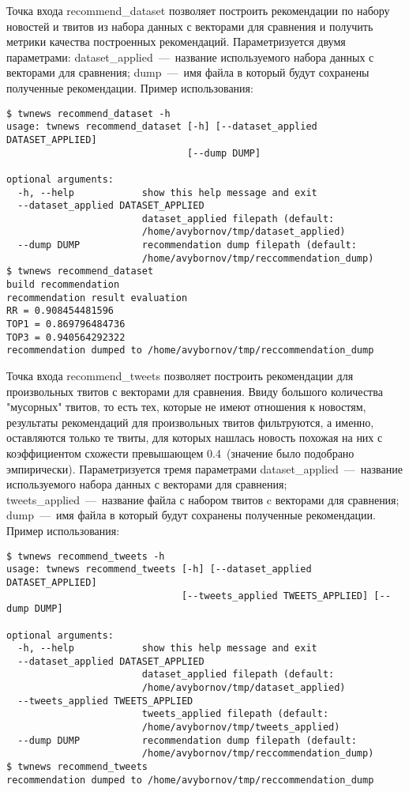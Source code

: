         Точка входа recommend\_dataset позволяет построить рекомендации по набору новостей и твитов из набора данных с векторами для сравнения
        и получить метрики качества построенных рекомендаций.
        Параметризуется двумя параметрами:
        dataset\_applied~---~название используемого набора данных с векторами для сравнения;
        dump~---~имя файла в который будут сохранены полученные рекомендации.
        Пример использования:
        \begin{lstlisting}
$ twnews recommend_dataset -h
usage: twnews recommend_dataset [-h] [--dataset_applied DATASET_APPLIED]
                                [--dump DUMP]

optional arguments:
  -h, --help            show this help message and exit
  --dataset_applied DATASET_APPLIED
                        dataset_applied filepath (default:
                        /home/avybornov/tmp/dataset_applied)
  --dump DUMP           recommendation dump filepath (default:
                        /home/avybornov/tmp/reccommendation_dump)
$ twnews recommend_dataset
build recommendation
recommendation result evaluation
RR = 0.908454481596
TOP1 = 0.869796484736
TOP3 = 0.940564292322
recommendation dumped to /home/avybornov/tmp/reccommendation_dump
        \end{lstlisting}


        Точка входа recommend\_tweets позволяет построить рекомендации для произвольных твитов с векторами для сравнения.
        Ввиду большого количества "мусорных" твитов, то есть тех, которые не имеют отношения к новостям, результаты рекомендаций
        для произвольных твитов фильтруются, а именно, оставляются только те твиты, для которых нашлась новость похожая на них
        с коэффициентом схожести превышающем 0.4~(значение было подобрано эмпирически).
        Параметризуется тремя параметрами
        dataset\_applied~---~название используемого набора данных с векторами для сравнения;
        tweets\_applied~---~название файла с набором твитов c векторами для сравнения;
        dump~---~имя файла в который будут сохранены полученные рекомендации.
        Пример использования:
        \begin{lstlisting}
$ twnews recommend_tweets -h
usage: twnews recommend_tweets [-h] [--dataset_applied DATASET_APPLIED]
                               [--tweets_applied TWEETS_APPLIED] [--dump DUMP]

optional arguments:
  -h, --help            show this help message and exit
  --dataset_applied DATASET_APPLIED
                        dataset_applied filepath (default:
                        /home/avybornov/tmp/dataset_applied)
  --tweets_applied TWEETS_APPLIED
                        tweets_applied filepath (default:
                        /home/avybornov/tmp/tweets_applied)
  --dump DUMP           recommendation dump filepath (default:
                        /home/avybornov/tmp/reccommendation_dump)
$ twnews recommend_tweets
recommendation dumped to /home/avybornov/tmp/reccommendation_dump

        \end{lstlisting}


